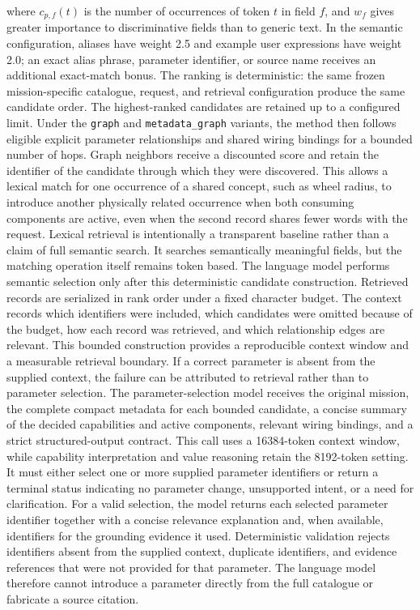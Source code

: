 where $c_{p,f}(t)$ is the number of occurrences of token $t$ in field $f$, and $w_f$ gives greater importance to discriminative fields than to generic text. In the semantic configuration, aliases have weight 2.5 and example user expressions have weight 2.0; an exact alias phrase, parameter identifier, or source name receives an additional exact-match bonus. The ranking is deterministic: the same frozen mission-specific catalogue, request, and retrieval configuration produce the same candidate order.
The highest-ranked candidates are retained up to a configured limit. Under the \texttt{graph} and \texttt{metadata\_graph} variants, the method then follows eligible explicit parameter relationships and shared wiring bindings for a bounded number of hops. Graph neighbors receive a discounted score and retain the identifier of the candidate through which they were discovered. This allows a lexical match for one occurrence of a shared concept, such as wheel radius, to introduce another physically related occurrence when both consuming components are active, even when the second record shares fewer words with the request.
Lexical retrieval is intentionally a transparent baseline rather than a claim of full semantic search. It searches semantically meaningful fields, but the matching operation itself remains token based. The language model performs semantic selection only after this deterministic candidate construction.
Retrieved records are serialized in rank order under a fixed character budget. The context records which identifiers were included, which candidates were omitted because of the budget, how each record was retrieved, and which relationship edges are relevant.
This bounded construction provides a reproducible context window and a measurable retrieval boundary. If a correct parameter is absent from the supplied context, the failure can be attributed to retrieval rather than to parameter selection.
The parameter-selection model receives the original mission, the complete compact metadata for each bounded candidate, a concise summary of the decided capabilities and active components, relevant wiring bindings, and a strict structured-output contract. This call uses a 16384-token context window, while capability interpretation and value reasoning retain the 8192-token setting. It must either select one or more supplied parameter identifiers or return a terminal status indicating no parameter change, unsupported intent, or a need for clarification.
For a valid selection, the model returns each selected parameter identifier together with a concise relevance explanation and, when available, identifiers for the grounding evidence it used. Deterministic validation rejects identifiers absent from the supplied context, duplicate identifiers, and evidence references that were not provided for that parameter. The language model therefore cannot introduce a parameter directly from the full catalogue or fabricate a source citation.
